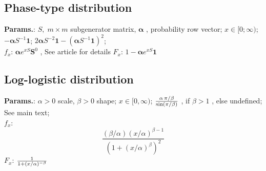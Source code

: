     
        
\subsection{Phase-type distribution}





    {\color{darkblue} \textbf{Params.}:} {$S,\; m\times m$ subgenerator matrix,  $\boldsymbol{\alpha}$ , probability row vector}; {$x \in [0; \infty)\!$}; {$-\boldsymbol{\alpha}{S}^{-1}\mathbf{1}$}; {$2\boldsymbol{\alpha}{S}^{-2}\mathbf{1}-(\boldsymbol{\alpha}{S}^{-1}\mathbf{1})^{2}$};\hspace{0.5cm}\\{\color{darkblue} \textbf{$f_x$}:} {$\boldsymbol{\alpha}e^{xS}\boldsymbol{S}^{0}$ ,  See article for details}{\color{darkblue} \textbf{$F_x$}:} {$1-\boldsymbol{\alpha}e^{xS}\boldsymbol{1}$}



    
        
\subsection{Log-logistic distribution}





    {\color{darkblue} \textbf{Params.}:} {$\alpha>0$ scale,  $\beta> 0$ shape}; {$x\in[0,\infty)$}; {${\alpha\,\pi/\beta \over \sin(\pi/\beta)}$ , if $\beta>1$ , else undefined}; {See main text};\hspace{0.5cm}\\{\color{darkblue} \textbf{$f_x$}:} {$$\frac{ (\beta/\alpha)(x/\alpha)^{\beta-1} }
                       { \left (1+(x/\alpha)^{\beta} \right)^2  }$$}{\color{darkblue} \textbf{$F_x$}:} {${ 1 \over 1+(x/\alpha)^{-\beta} }$}



